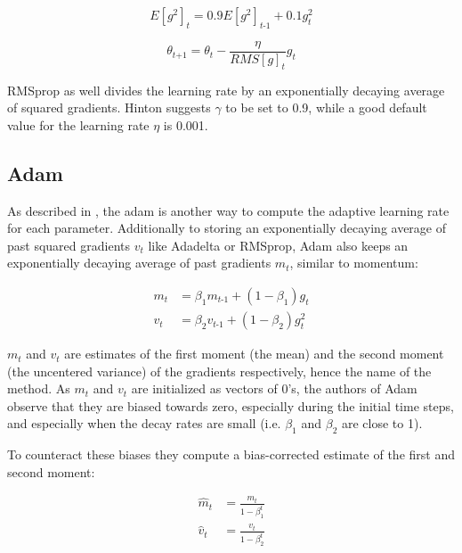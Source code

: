 \documentclass[12pt,oneside,a4paper,parskip]{scrbook}
\begin{document}
\begin{equation}
  \textit{E}[\textit{g}^2]_t = 0.9\textit{E}[\textit{g}^2]_\textit{t-1} + 0.1\textit{g}^2_t
  \label{equ:rmsprop_1}
\end{equation}

\begin{equation}
  \theta_\textit{t+1} = \theta_\textit{t}-\frac{\eta}{RMS[\textit{g}]_t} \textit{g}_\textit{t}
  \label{equ:rmsprop_2}
\end{equation}

RMSprop as well divides the learning rate by an exponentially decaying average of squared gradients.
Hinton suggests $\gamma$ to be set to 0.9, while a good default value for the learning rate $\eta$ is 0.001. \cite{overvieDiffRSLVQ}

\subsection{Adam}
As described in \cite{Kingma2014AdamAM}, the \ac{adam} is another way to compute the adaptive 
learning rate for each parameter. Additionally to storing an exponentially decaying average of past squared gradients
$\textit{v}_t$ like Adadelta or RMSprop, Adam also keeps an exponentially decaying average of past gradients $\textit{m}_t$,
similar to momentum:

\begin{equation}
  \begin{split}
  \textit{m}_t &= \beta_1\textit{m}_\textit{t-1} + (1-\beta_1)\textit{g}_t \\
  \textit{v}_t &= \beta_2\textit{v}_\textit{t-1} + (1-\beta_2)\textit{g}^2_t
  \end{split}
  \label{equ:adam_1}
\end{equation}

$\textit{m}_t$ and $\textit{v}_t$ are estimates of the first moment (the mean) and the second moment (the uncentered variance)
of the gradients respectively, hence the name of the method. As $\textit{m}_t$ and $\textit{v}_t$ are initialized as vectors of 
0's, the authors of Adam observe that they are biased towards zero, especially during the initial time steps, and especially 
when the decay rates are small (i.e. $\beta_1$ and $\beta_2$ are close to 1).

To counteract these biases they compute a bias-corrected estimate of the first and second moment:

\begin{equation}
  \begin{split}
  \hat{m}_t &= \frac{\textit{m}_t}{1-\beta^t_1} \\
  \hat{v}_t &= \frac{\textit{v}_t}{1-\beta^t_2}
  \end{split}
  \label{equ:adam_2}
\end{equation}
\end{document}
